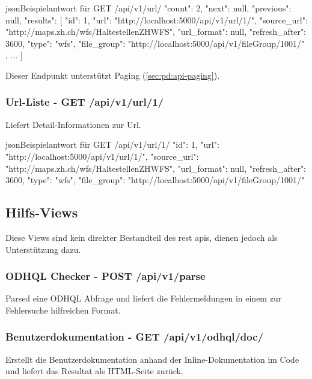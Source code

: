 \begin{srclst}{json}{Beispielantwort für GET /api/v1/url/}
{
    "count": 2, 
    "next": null, 
    "previous": null, 
    "results": [
        {
            "id": 1, 
            "url": "http://localhost:5000/api/v1/url/1/", 
            "source_url": "http://maps.zh.ch/wfs/HaltestellenZHWFS", 
            "url_format": null, 
            "refresh_after": 3600, 
            "type": "wfs", 
            "file_group": "http://localhost:5000/api/v1/fileGroup/1001/"
        }, 
        ...
    ]
}
\end{srclst}

Dieser Endpunkt unterstützt Paging (\cref{sec:pd:api-paging}).

\subsubsection{Url-Liste - GET /api/v1/url/1/}
Liefert Detail-Informationen zur Url.

\begin{srclst}{json}{Beispielantwort für GET /api/v1/url/1/}
{
    "id": 1, 
    "url": "http://localhost:5000/api/v1/url/1/", 
    "source_url": "http://maps.zh.ch/wfs/HaltestellenZHWFS", 
    "url_format": null, 
    "refresh_after": 3600, 
    "type": "wfs", 
    "file_group": "http://localhost:5000/api/v1/fileGroup/1001/"
}
\end{srclst}

\subsection{Hilfs-Views}
Diese Views sind kein direkter Bestandteil des \gls{rest} \acs{api}s, dienen jedoch als Unterstützung dazu.

\subsubsection{ODHQL Checker - POST /api/v1/parse} \label{sec:pd:api-parse}
Parsed eine ODHQL Abfrage und liefert die Fehlermeldungen in einem zur Fehlersuche hilfreichen Format.

\subsubsection{Benutzerdokumentation - GET /api/v1/odhql/doc/}
Erstellt die Benutzerdokumentation anhand der Inline-Dokumentation im Code und liefert das Resultat als HTML-Seite zurück.